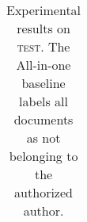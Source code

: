 \documentclass[11pt]{article}
\newcommand\test{\textsc{test}\xspace}
\begin{document}
\begin{table}
\begin{center}
\begin{tabular}{|l|c|ccc|cccc|}
\hline
\end{tabular}
\caption{%
Experimental results on \test. The All-in-one baseline labels all
documents as not belonging to the authorized author. \label{results}}
\end{center}
\end{table}




\end{document}
